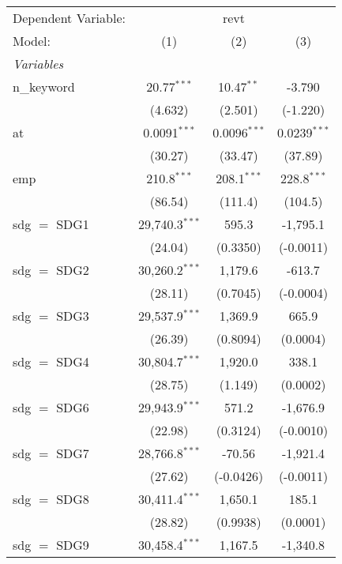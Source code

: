 
\begingroup
\centering
\begin{tabular}{lccc}
   \tabularnewline \midrule \midrule
   Dependent Variable: & \multicolumn{3}{c}{revt}\\
   Model:        & (1)              & (2)            & (3)\\  
   \midrule
   \emph{Variables}\\
   n\_keyword    & 20.77$^{***}$    & 10.47$^{**}$   & -3.790\\   
                 & (4.632)          & (2.501)        & (-1.220)\\   
   at            & 0.0091$^{***}$   & 0.0096$^{***}$ & 0.0239$^{***}$\\   
                 & (30.27)          & (33.47)        & (37.89)\\   
   emp           & 210.8$^{***}$    & 208.1$^{***}$  & 228.8$^{***}$\\   
                 & (86.54)          & (111.4)        & (104.5)\\   
   sdg $=$ SDG1  & 29,740.3$^{***}$ & 595.3          & -1,795.1\\   
                 & (24.04)          & (0.3350)       & (-0.0011)\\   
   sdg $=$ SDG2  & 30,260.2$^{***}$ & 1,179.6        & -613.7\\   
                 & (28.11)          & (0.7045)       & (-0.0004)\\   
   sdg $=$ SDG3  & 29,537.9$^{***}$ & 1,369.9        & 665.9\\   
                 & (26.39)          & (0.8094)       & (0.0004)\\   
   sdg $=$ SDG4  & 30,804.7$^{***}$ & 1,920.0        & 338.1\\   
                 & (28.75)          & (1.149)        & (0.0002)\\   
   sdg $=$ SDG6  & 29,943.9$^{***}$ & 571.2          & -1,676.9\\   
                 & (22.98)          & (0.3124)       & (-0.0010)\\   
   sdg $=$ SDG7  & 28,766.8$^{***}$ & -70.56         & -1,921.4\\   
                 & (27.62)          & (-0.0426)      & (-0.0011)\\   
   sdg $=$ SDG8  & 30,411.4$^{***}$ & 1,650.1        & 185.1\\   
                 & (28.82)          & (0.9938)       & (0.0001)\\   
   sdg $=$ SDG9  & 30,458.4$^{***}$ & 1,167.5        & -1,340.8\\   

\end{tabular}
